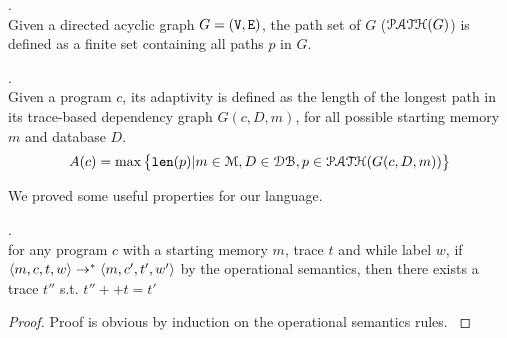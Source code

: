 \documentclass[a4paper,11pt]{article}
\begin{document}
%
\begin{defn}.
\\
Given a directed acyclic graph $G = (\mathtt{V}, \mathtt{E})$, 
the path set of $G$ ($\mathcal{PATH}(G)$) is defined as a finite set containing all paths $p$ in $G$.
\end{defn}
%
%
\begin{defn}.
\label{def:trace-based_adapt}
\\
Given a program $c$, 
its adaptivity is defined as the length of the longest path in its
trace-based dependency graph $G(c,D,m)$, 
for all possible starting memory $m$ and database $D$.
%
$$
A(c) = \max \big \{ 
\mathtt{len}(p) \vert m \in \mathcal{M}, D \in \mathcal{DB},p \in \mathcal{PATH}(G(c, D, m)) 
\big \} 
$$
\end{defn}
%
We proved some useful properties for our language.
\begin{lem}
.
\\
{
for any program $c$ with a starting memory $m$, trace $t$ and while label $w$, if 
$  
\langle m, c, t, w \rangle 
\rightarrow^{*} 
\langle m, c', t', w' \rangle 
$ by the operational semantics, then there exists a trace $t''$ 
s.t. $t'' ++ t = t'$
}
\end{lem}
%
\begin{proof}
{
Proof is obvious by induction on the operational semantics rules.
}
\end{proof}
%
\end{document}
